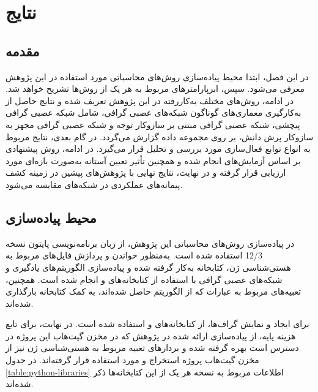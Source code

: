 \chapter{نتایج}

\section{مقدمه}
در این فصل، ابتدا محیط پیاده‌سازی روش‌های محاسباتی مورد استفاده در این پژوهش معرفی می‌شود. سپس، ابرپارامترهای مربوط به هر یک از روش‌ها تشریح خواهد شد. در ادامه، روش‌های مختلف به‌کاررفته در این پژوهش تعریف شده و نتایج حاصل از به‌کارگیری معماری‌های گوناگون شبکه‌های عصبی گرافی، شامل شبکه عصبی گرافی پیچشی، شبکه عصبی گرافی مبتنی بر سازوکار توجه و شبکه عصبی گرافی مجهز به سازوکار پرش دانش، بر روی مجموعه داده   گزارش می‌گردد. 
در گام بعدی، نتایج مربوط به انواع توابع فعال‌سازی مورد بررسی و تحلیل قرار می‌گیرد. در ادامه، روش پیشنهادی بر اساس آزمایش‌های انجام‌ شده و همچنین تأثیر تعیین آستانه به‌صورت بازه‌ای مورد ارزیابی قرار گرفته و در نهایت، نتایج نهایی با پژوهش‌های پیشین در زمینه کشف پیمانه‌های عملکردی در شبکه‌های  مقایسه می‌شود.

\section{محیط پیاده‌سازی}

در پیاده‌سازی روش‌های محاسباتی این پژوهش، از زبان برنامه‌نویسی پایتون نسخه 12/3 استفاده شده است. به‌منظور خواندن و پردازش فایل‌های مربوط به هستی‌شناسی ژن، کتابخانه  به‌کار گرفته شده و پیاده‌سازی الگوریتم‌های یادگیری و شبکه‌های عصبی گرافی با استفاده از کتابخانه‌های  و  انجام شده است. همچنین، تعبیه‌های مربوط به عبارات  که از الگوریتم  حاصل شده‌اند، به کمک کتابخانه  بارگذاری شده‌اند. 

برای ایجاد و نمایش گراف‌ها، از کتابخانه‌های  و  استفاده شده است. در نهایت، برای تابع هزینه پایه، از پیاده‌سازی ارائه‌ شده در پژوهش  که در مخزن گیت‌هاب این پروژه در دسترس است بهره گرفته شده و بردارهای تعبیه مربوط به هستی‌شناسی ژن نیز از مخزن گیت‌هاب پروژه  استخراج و مورد استفاده قرار گرفته‌اند. در جدول \ref{table:python-libraries} اطلاعات مربوط به نسخه هر یک از این کتابخانه‌ها ذکر شده‌اند.

